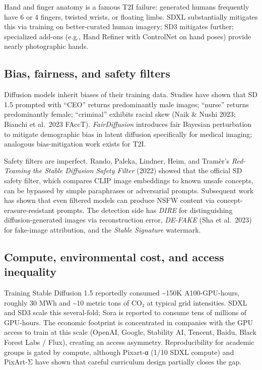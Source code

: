 \documentclass{article}
\begin{document}
Hand and finger anatomy is a famous T2I failure: generated humans frequently have 6 or 4 fingers, twisted wrists, or floating limbs. SDXL substantially mitigates this via training on better-curated human imagery; SD3 mitigates further; specialized add-ons (e.g., Hand Refiner with ControlNet on hand poses) provide nearly photographic hands.

\subsection{Bias, fairness, and safety filters}\label{bias-fairness-and-safety-filters}

Diffusion models inherit biases of their training data. Studies have shown that SD 1.5 prompted with ``CEO'' returns predominantly male images; ``nurse'' returns predominantly female; ``criminal'' exhibits racial skew (Naik \& Nushi 2023; Bianchi et al.~2023 FAccT). \emph{FairDiffusion} \citep{luo20252025} introduces fair Bayesian perturbation to mitigate demographic bias in latent diffusion specifically for medical imaging; analogous bias-mitigation work exists for T2I.

Safety filters are imperfect. Rando, Paleka, Lindner, Heim, and Tramèr's \emph{Red-Teaming the Stable Diffusion Safety Filter} (2022) showed that the official SD safety filter, which compares CLIP image embeddings to known unsafe concepts, can be bypassed by simple paraphrases or adversarial prompts. Subsequent work has shown that even filtered models can produce NSFW content via concept-erasure-resistant prompts. The detection side has \emph{DIRE} \citep{wang20232023} for distinguishing diffusion-generated images via reconstruction error, \emph{DE-FAKE} (Sha et al.~2023) for fake-image attribution, and the \emph{Stable Signature} watermark.

\subsection{Compute, environmental cost, and access inequality}\label{compute-environmental-cost-and-access-inequality}

Training Stable Diffusion 1.5 reportedly consumed \textasciitilde150K A100-GPU-hours, roughly 30 MWh and \textasciitilde10 metric tons of CO₂ at typical grid intensities. SDXL and SD3 scale this several-fold; Sora is reported to consume tens of millions of GPU-hours. The economic footprint is concentrated in companies with the GPU access to train at this scale (OpenAI, Google, Stability AI, Tencent, Baidu, Black Forest Labs / Flux), creating an access asymmetry. Reproducibility for academic groups is gated by compute, although Pixart-α (1/10 SDXL compute) and PixArt-Σ have shown that careful curriculum design partially closes the gap.
\end{document}
